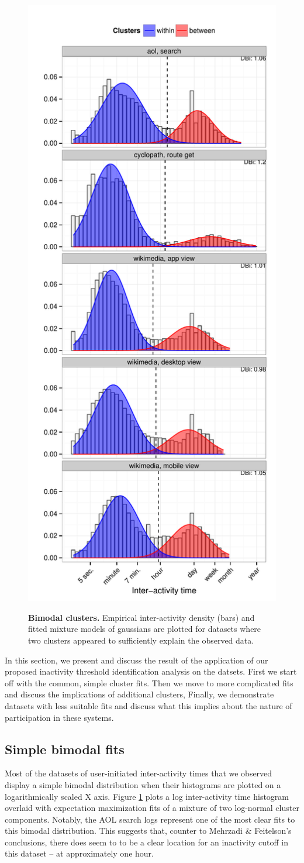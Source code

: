 \begin{figure}
\centering
\includegraphics[width=.45\textwidth]{figures/bimodal_clusters.pdf}
\label{fig:bimodal_clusters}
\caption{
    \textbf{Bimodal clusters.} Empirical inter-activity density (bars) and fitted mixture models of gaussians are plotted for datasets where two clusters appeared to sufficiently explain the observed data.
}
\end{figure}

In this section, we present and discuss the result of the application of our proposed inactivity threshold identification analysis on the datsets.  First we start off with the common, simple cluster fits.  Then we move to more complicated fits and discuss the implications of additional clusters,  Finally, we demonstrate datasets with less suitable fits and discuss what this implies about the nature of participation in these systems.

\subsection{Simple bimodal fits}
Most of the datasets of user-initiated inter-activity times that we observed display a simple bimodal distribution when their histograms are plotted on a logarithmically scaled X axis.  Figure \ref{fig:bimodal_clusters} plots a log inter-activity time histogram overlaid with expectation maximization fits of a mixture of two log-normal cluster components.  Notably, the AOL search logs represent one of the most clear fits to this bimodal distribution.  This suggests that, counter to Mehrzadi
\& Feitelson's conclusions\cite{mehrzadi2012onextracting}, there does seem to to be a clear location for an inactivity cutoff in this dataset -- at approximately one hour.

